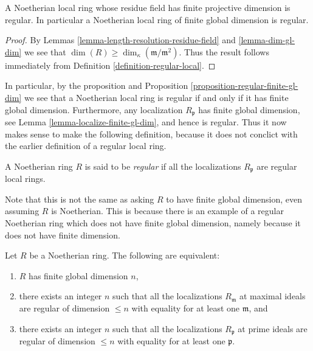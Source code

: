 \begin{proposition}
\label{proposition-finite-gl-dim-regular}
A Noetherian local ring whose residue field
has finite projective dimension is regular.
In particular a Noetherian local ring of
finite global dimension is regular.
\end{proposition}

\begin{proof}
By Lemmas \ref{lemma-length-resolution-residue-field}
and \ref{lemma-dim-gl-dim} we see that
$\dim(R) \geq \dim_\kappa(\mathfrak m /\mathfrak m^2)$.
Thus the result follows immediately from Definition
\ref{definition-regular-local}.
\end{proof}

\noindent
In particular, by the proposition and
Proposition \ref{proposition-regular-finite-gl-dim}
we see that
a Noetherian local ring is regular if and only if
it has finite global dimension. Furthermore, any localization
$R_{\mathfrak p}$ has finite global dimension,
see Lemma \ref{lemma-localize-finite-gl-dim},
and hence is regular. Thus it now
makes sense to make the following definition,
because it does not conclict with the earlier
definition of a regular local ring.

\begin{definition}
\label{definition-regular}
A Noetherian ring $R$ is said to be {\it regular}
if all the localizations $R_{\mathfrak p}$ are
regular local rings.
\end{definition}

\noindent
Note that this is not the same as asking $R$ to have finite
global dimension, even assuming $R$ is Noetherian. This is
because there is an example of a regular Noetherian ring
which does not have finite global dimension, namely because
it does not have finite dimension.

\begin{lemma}
\label{lemma-finite-gl-dim-finite-dim-regular}
Let $R$ be a Noetherian ring.
The following are equivalent:
\begin{enumerate}
\item $R$ has finite global dimension $n$,
\item there exists an integer $n$ such that
all the localizations $R_{\mathfrak m}$ at maximal ideals
are regular of dimension $\leq n$ with equality for at least
one $\mathfrak m$, and
\item there exists an integer $n$ such that
all the localizations $R_{\mathfrak p}$ at prime ideals
are regular of dimension $\leq n$ with equality for at least
one $\mathfrak p$.
\end{enumerate}
\end{lemma}

